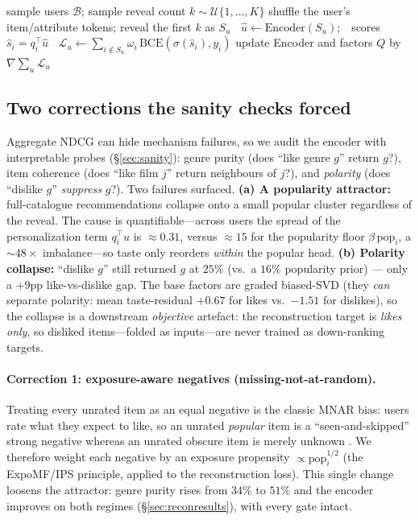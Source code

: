 \documentclass[11pt]{article}
\begin{document}
\begin{algorithm}[h]\small
\caption{Reconstruction-encoder training (one step)}
\begin{algorithmic}[1]
\State sample users $\mathcal B$; sample reveal count $k\sim\mathcal U\{1,\dots,K\}$
 shuffle the user's item/attribute tokens; reveal the first $k$ as $S_u$
\State $\;\;\hat u \gets \mathrm{Encoder}(S_u)$;\ \ scores $\hat s_i=q_i^\top\hat u$
\State $\;\;\mathcal L_u \gets \sum_{i\notin S_u}\omega_i\,\mathrm{BCE}(\sigma(\hat s_i),y_i)$ 
\EndFor
\State update Encoder and factors $Q$ by $\nabla\sum_u \mathcal L_u$
\end{algorithmic}
\end{algorithm}

\subsection{Two corrections the sanity checks forced}\label{sec:corrections}
Aggregate NDCG can hide mechanism failures, so we audit the encoder with interpretable probes (\S\ref{sec:sanity}):
genre purity (does ``like genre $g$'' return $g$?), item coherence (does ``like film $j$'' return neighbours of $j$?),
and \emph{polarity} (does ``dislike $g$'' \emph{suppress} $g$?). Two failures surfaced. \textbf{(a) A popularity
attractor:} full-catalogue recommendations collapse onto a small popular cluster regardless of the reveal. The cause is
quantifiable---across users the spread of the personalization term $q_i^\top u$ is $\approx\!0.31$, versus $\approx\!15$
for the popularity floor $\beta\,\mathrm{pop}_i$, a $\sim\!48\times$ imbalance---so taste only reorders \emph{within}
the popular head. \textbf{(b) Polarity collapse:} ``dislike $g$'' still returned $g$ at $25\%$ (vs.\ a $16\%$
popularity prior) --- only a $+9$pp like-vs-dislike gap. The base factors are graded biased-SVD (they \emph{can}
separate polarity: mean taste-residual $+0.67$ for likes vs.\ $-1.51$ for dislikes), so the collapse is a downstream
\emph{objective} artefact: the reconstruction target is \emph{likes only}, so disliked items---folded as inputs---are
never trained as down-ranking targets.

\paragraph{Correction 1: exposure-aware negatives (missing-not-at-random).} Treating every unrated item as an equal
negative is the classic MNAR bias: users rate what they expect to like, so an unrated \emph{popular} item is a
``seen-and-skipped'' strong negative whereas an unrated obscure item is merely unknown
\cite{steck10,hu08,bpr09,expomf16,schnabel16,yang18}. We therefore weight each negative by an exposure propensity
$\propto \mathrm{pop}_i^{1/2}$ (the ExpoMF/IPS principle, applied to the reconstruction loss). This single change
loosens the attractor: genre purity rises from $34\%$ to $51\%$ and the encoder improves on both regimes
(\S\ref{sec:reconresults}), with every gate intact.
\end{document}
